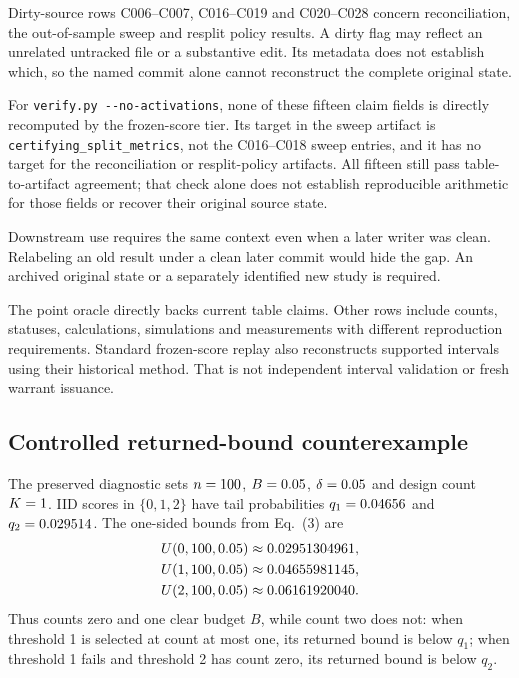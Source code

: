 Dirty-source rows C006--C007, C016--C019 and C020--C028 concern reconciliation,
the out-of-sample sweep and resplit policy results. A dirty flag may reflect an
unrelated untracked file or a substantive edit. Its metadata does not establish
which, so the named commit alone cannot reconstruct the complete original state.

For \verb|verify.py --no-activations|, none of these fifteen claim fields is
directly recomputed by the frozen-score tier. Its target in the sweep artifact is
\texttt{certifying\_split\_metrics}, not the C016--C018 sweep entries, and it has
no target for the reconciliation or resplit-policy artifacts. All fifteen
still pass table-to-artifact agreement; that check alone does not establish
reproducible arithmetic for those fields or recover their original source state.

Downstream use requires the same context even when a later writer was clean.
Relabeling an old result under a clean later commit would hide the gap. An
archived original state or a separately identified new study is required.

The point oracle directly backs \DirectPointClaims{} current table claims.
Other rows include counts, statuses, calculations, simulations and measurements
with different reproduction requirements. Standard frozen-score replay also
reconstructs supported intervals using their historical method. That is not
independent interval validation or fresh warrant issuance.

\subsection{Controlled returned-bound counterexample}
\label{sec:witness}
The preserved diagnostic sets \(n=100\), \(B=0.05\),
\(\delta=0.05\) and design count \(K=1\). IID scores in
\(\{0,1,2\}\) have tail probabilities \(q_1=0.04656\) and
\(q_2=0.029514\). The one-sided bounds from Eq.~(3) are
\[
\begin{aligned}
U(0,100,0.05)&\approx0.02951304961,\\
U(1,100,0.05)&\approx0.04655981145,\\
U(2,100,0.05)&\approx0.06161920040.
\end{aligned}
\]
Thus counts zero and one clear budget \(B\), while count two does not:
when threshold 1 is selected at count at most one, its returned bound is
below \(q_1\); when threshold 1 fails and threshold 2 has count zero,
its returned bound is below \(q_2\).


